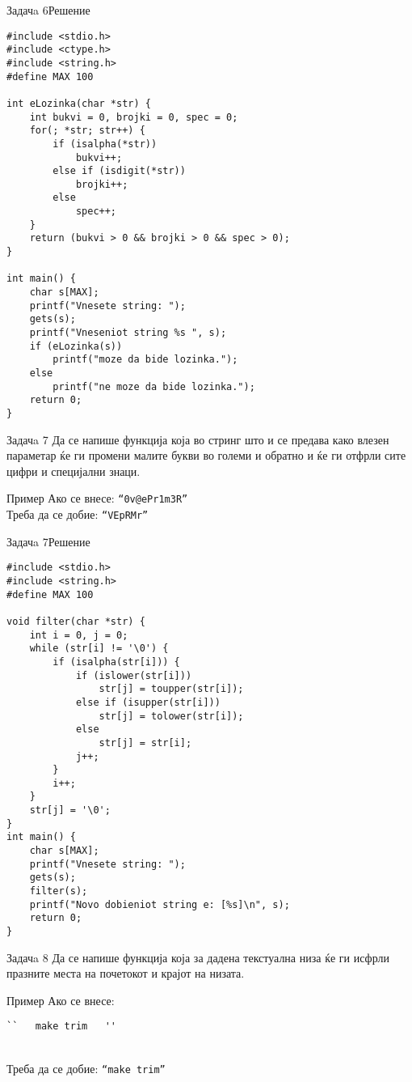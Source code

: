 \begin{frame}[fragile]{Задачa 6}{Решение}
\begin{lstlisting}
#include <stdio.h>
#include <ctype.h>
#include <string.h>
#define MAX 100

int eLozinka(char *str) {
    int bukvi = 0, brojki = 0, spec = 0;
    for(; *str; str++) {
        if (isalpha(*str))
            bukvi++;
        else if (isdigit(*str))
            brojki++;
        else
            spec++;
    }
    return (bukvi > 0 && brojki > 0 && spec > 0);
}

int main() {
    char s[MAX];
    printf("Vnesete string: ");
    gets(s);
    printf("Vneseniot string %s ", s);
    if (eLozinka(s))
        printf("moze da bide lozinka.");
    else
        printf("ne moze da bide lozinka.");
    return 0;
}
\end{lstlisting}
\end{frame}

\begin{frame}{Задачa 7}
Да се напише функција која во стринг што и се предава како влезен параметар ќе
ги промени малите букви во големи и обратно и ќе ги отфрли сите цифри и
специјални знаци.
    
\begin{exampleblock}{Пример}
Ако се внесе: \texttt{``0v@ePr1m3R''} \\
Треба да се добие: \texttt{``VEpRMr''} 
\end{exampleblock}
\end{frame}

\begin{frame}[fragile]{Задачa 7}{Решение}
\begin{lstlisting}
#include <stdio.h>
#include <string.h>
#define MAX 100

void filter(char *str) {
    int i = 0, j = 0;
    while (str[i] != '\0') {
        if (isalpha(str[i])) {
            if (islower(str[i]))
                str[j] = toupper(str[i]);
            else if (isupper(str[i]))
                str[j] = tolower(str[i]);
            else
                str[j] = str[i];
            j++;
        }
        i++;
    }
    str[j] = '\0';
}
int main() {
    char s[MAX];
    printf("Vnesete string: ");
    gets(s);
    filter(s);
    printf("Novo dobieniot string e: [%s]\n", s);
    return 0;
}
\end{lstlisting}
\end{frame}

\begin{frame}[fragile]{Задачa 8}
Да се напише функција која за дадена текстуална низа ќе ги исфрли празните места
на почетокот и крајот на низата.
\begin{exampleblock}{Пример}
Ако се внесе: \begin{verbatim}``   make trim   ''\end{verbatim} \\
Треба да се добие: \texttt{``make trim''} 
\end{exampleblock}
\end{frame}

